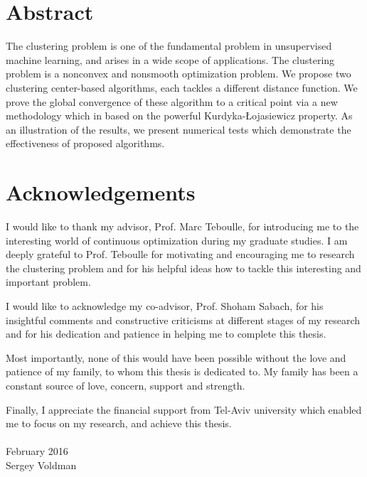 \setcounter{page}{3}
\chapter*{Abstract}

The clustering problem is one of the fundamental problem in unsupervised machine learning, and arises in a wide scope of applications. The clustering problem is a nonconvex and nonsmooth optimization problem. We propose two clustering center-based algorithms, each tackles a different distance function. We prove the global convergence of these algorithm to a critical point via a new methodology which in based on the powerful Kurdyka-{\L}ojasiewicz property. As an illustration of the results, we present numerical tests which demonstrate the effectiveness of proposed algorithms.



\chapter*{Acknowledgements}

I would like to thank my advisor, Prof. Marc Teboulle, for introducing me to the interesting world of continuous optimization during my graduate studies. I am deeply grateful to Prof. Teboulle for motivating and encouraging me to research the clustering problem and for his helpful ideas how to tackle this interesting and important problem.

I would like to acknowledge my co-advisor, Prof. Shoham Sabach, for his insightful comments and constructive criticisms at different stages of my research and for his dedication and patience in helping me to complete this thesis.

Most importantly, none of this would have been possible without the love and patience of my family, to whom this thesis is dedicated to. My family has been a constant source of love, concern, support and strength.

Finally, I appreciate the financial support from Tel-Aviv university which enabled me to focus on my research, and achieve this thesis.
\\
\\
\noindent February 2016\\
\noindent Sergey Voldman



\nobreak
